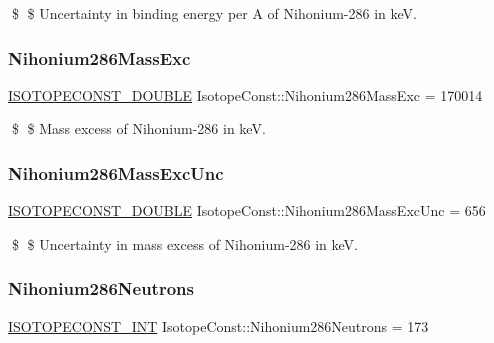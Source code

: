 \$ \$ Uncertainty in binding energy per A of Nihonium-\/286 in keV. \mbox{\label{group___isotope_const-_nihonium-_nh286_gab218f8ec302a8dac8239d16543ed7050}} 
\subsubsection{\texorpdfstring{Nihonium286\+Mass\+Exc}{Nihonium286MassExc}}
{\footnotesize\ttfamily \mbox{\hyperlink{group___isotope_const-_macros_ga8f45a7272ce02c0b4c65c44636ed719a}{I\+S\+O\+T\+O\+P\+E\+C\+O\+N\+S\+T\+\_\+\+D\+O\+U\+B\+LE}} Isotope\+Const\+::\+Nihonium286\+Mass\+Exc = 170014}

\$ \$ Mass excess of Nihonium-\/286 in keV. \mbox{\label{group___isotope_const-_nihonium-_nh286_ga795030e9e6cb0050b7b0ef6985d8adda}} 
\subsubsection{\texorpdfstring{Nihonium286\+Mass\+Exc\+Unc}{Nihonium286MassExcUnc}}
{\footnotesize\ttfamily \mbox{\hyperlink{group___isotope_const-_macros_ga8f45a7272ce02c0b4c65c44636ed719a}{I\+S\+O\+T\+O\+P\+E\+C\+O\+N\+S\+T\+\_\+\+D\+O\+U\+B\+LE}} Isotope\+Const\+::\+Nihonium286\+Mass\+Exc\+Unc = 656}

\$ \$ Uncertainty in mass excess of Nihonium-\/286 in keV. \mbox{\label{group___isotope_const-_nihonium-_nh286_gad570360409f83cc1f981cc12b510ae24}} 
\subsubsection{\texorpdfstring{Nihonium286\+Neutrons}{Nihonium286Neutrons}}
{\footnotesize\ttfamily \mbox{\hyperlink{group___isotope_const-_macros_ga5f18360b3e99483a35c32d789e62621c}{I\+S\+O\+T\+O\+P\+E\+C\+O\+N\+S\+T\+\_\+\+I\+NT}} Isotope\+Const\+::\+Nihonium286\+Neutrons = 173}

